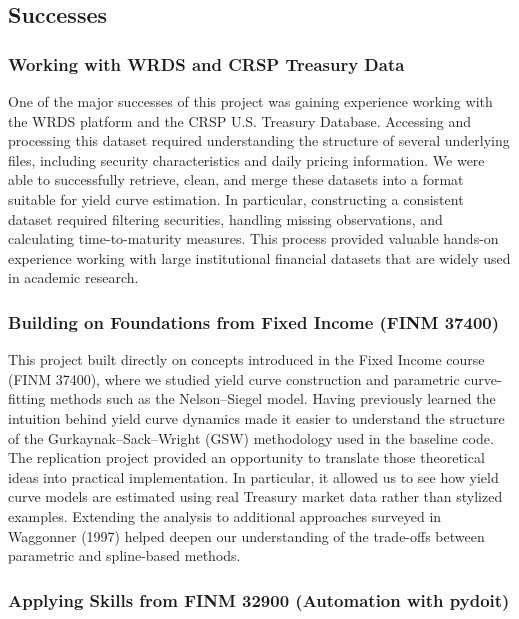 \documentclass{article}
\begin{document}
\subsection{Successes}

\subsubsection{Working with WRDS and CRSP Treasury Data}

One of the major successes of this project was gaining experience working with the WRDS platform and the CRSP U.S. Treasury Database. Accessing and processing this dataset required understanding the structure of several underlying files, including security characteristics and daily pricing information. We were able to successfully retrieve, clean, and merge these datasets into a format suitable for yield curve estimation. In particular, constructing a consistent dataset required filtering securities, handling missing observations, and calculating time-to-maturity measures. This process provided valuable hands-on experience working with large institutional financial datasets that are widely used in academic research.

\subsubsection{Building on Foundations from Fixed Income (FINM 37400)}

This project built directly on concepts introduced in the Fixed Income course (FINM 37400), where we studied yield curve construction and parametric curve-fitting methods such as the Nelson–Siegel model. Having previously learned the intuition behind yield curve dynamics made it easier to understand the structure of the Gurkaynak–Sack–Wright (GSW) methodology used in the baseline code. The replication project provided an opportunity to translate those theoretical ideas into practical implementation. In particular, it allowed us to see how yield curve models are estimated using real Treasury market data rather than stylized examples. Extending the analysis to additional approaches surveyed in Waggonner (1997) helped deepen our understanding of the trade-offs between parametric and spline-based methods.

\subsubsection{Applying Skills from FINM 32900 (Automation with pydoit)}
\end{document}
